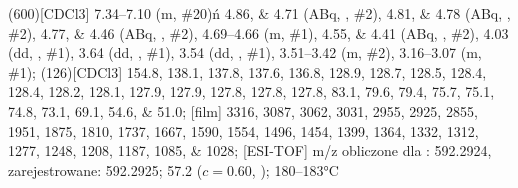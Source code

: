 \begin{fullexp}
	\NMR(600)[CDCl3] \numrange{7.34}{7.10} (m, \#{20})ń \numlist{4.86;4.71} (ABq, , \#{2}), \numlist{4.81;4.78} (ABq, , \#{2}), \numlist{4.77;4.46} (ABq, , \#{2}), \numrange{4.69}{4.66} (m, \#{1}), \numlist{4.55;4.41} (ABq, , \#{2}), \num{4.03} (dd, , \#{1}), \num{3.64} (dd, , \#{1}), \num{3.54} (dd, , \#{1}), \numrange{3.51}{3.42} (m, \#{2}), \numrange{3.16}{3.07} (m, \#{1});
	(126)[CDCl3] \numlist{154.8; 138.1; 137.8; 137.6; 136.8; 128.9; 128.7; 128.5; 128.4; 128.4; 128.2; 128.1; 127.9; 127.9; 127.8; 127.8; 127.8; 83.1; 79.6; 79.4; 75.7; 75.1; 74.8; 73.1; 69.1; 54.6; 51.0};
	[film] \numlist{3316; 3087; 3062; 3031; 2955; 2925; 2855; 1951; 1875; 1810; 1737; 1667; 1590; 1554; 1496; 1454; 1399; 1364; 1332; 1312; 1277; 1248; 1208; 1187; 1085; 1028};
	[ESI-TOF] m/z obliczone dla : \num{592.2924}, zarejestrowane: \num{592.2925};
	\data{[$\alpha^{23}_D$]~$=$} \num{57.2} ($c = 0.60$, );
	 \numrange{180}{183}\si{\celsius}
\end{fullexp}
